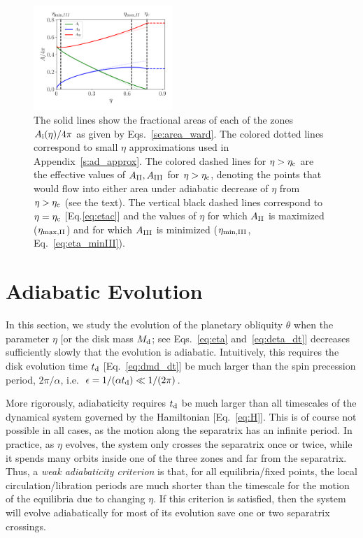 \begin{figure}
    \centering
    \includegraphics[width=0.47\textwidth]{plots_diskdisp/1_areas.png}
    \caption{The solid lines show the fractional areas of each of the zones
    $A_{\rm i}(\eta) / 4\pi$ as given by Eqs.~\eqref{se:area_ward}. The colored
    dotted lines correspond to small $\eta$ approximations used in
    Appendix~\ref{s:ad_approx}. The colored dashed lines for $\eta > \eta_{\rm
    c}$ are the effective values of $A_{\rm II}, A_{\rm III}$ for $\eta >
    \eta_{\rm c}$, denoting the points that would flow into either area under
    adiabatic decrease of $\eta$ from $\eta > \eta_{\rm c}$ (see the text). The
    vertical black dashed lines correspond to $\eta = \eta_{\rm c}$
    [Eq.\eqref{eq:etac}] and the values of $\eta$ for which $A_{\rm II}$ is
    maximized ($\eta_{\rm \max, II}$) and for which $A_{\rm III}$ is minimized
    ($\eta_{\rm \min, III}$, Eq.~\eqref{eq:eta_minIII}).}\label{fig:eq_areas}
\end{figure}

\section{Adiabatic Evolution}\label{s:ad}

In this section, we study the evolution of the planetary obliquity $\theta$ when
the parameter $\eta$ [or the disk mass $M_{\rm d}$; see Eqs.~\eqref{eq:eta}
and~\eqref{eq:deta_dt}] decreases sufficiently slowly that the evolution is
adiabatic. Intuitively, this requires the disk evolution time
$t_{\rm d}$ [Eq.~\eqref{eq:dmd_dt}] be much larger than the spin precession
period, $2\pi / \alpha$, i.e.\ $\epsilon = 1 / (\alpha t_{\rm d}) \ll 1/
(2\pi)$.

More rigorously, adiabaticity requires $t_{\rm d}$ be much larger than all
timescales of the dynamical system governed by the Hamiltonian
[Eq.~\eqref{eq:H}]. This is of course not possible in all cases, as the motion
along the separatrix has an infinite period. In practice, as $\eta$ evolves, the
system only crosses the separatrix once or twice, while it spends many orbits
inside one of the three zones and far from the separatrix. Thus, a \emph{weak
adiabaticity criterion} is that, for all equilibria/fixed points, the local
circulation/libration periods are much shorter than the timescale for the motion
of the equilibria due to changing $\eta$. If this criterion is satisfied, then
the system will evolve adiabatically for most of its evolution save one or two
separatrix crossings.

